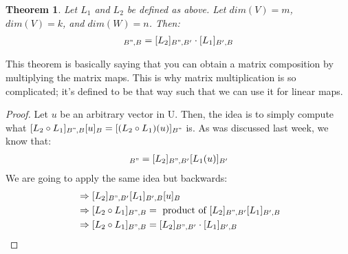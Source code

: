 \documentclass[a4paper, 12pt]{article}
\newtheorem{theorem}{Theorem}
\theoremstyle{definition}
\theoremstyle{definition}
\theoremstyle{definition}
\theoremstyle{definition}
\begin{document}
{\begin{theorem}
	Let $L_1$ and $L_2$ be defined as above. Let $dim(V) = m$, $dim(V) = k$, and $dim(W) = n$. Then: 
	\begin{align*}
		[L_2 \circ L_1 ]_{B", B} = [L_2]_{B",B'} \cdot [L_1]_{B',B} 
	\end{align*}
\end{theorem}
This theorem is basically saying that you can obtain a matrix composition by multiplying the matrix maps. This is why matrix multiplication is so complicated; it's defined to be that way such that we can use it for linear maps. 
\begin{proof}
	Let $u$ be an arbitrary vector in U. Then, the idea is to simply compute what $[L_2 \circ L_1]_{B", B} [u]_B = [(L_2 \circ L_1)(u)]_{B"}$ is. As was discussed last week, we know that: 
	\begin{align*}
		[L_2(L_1(u))]_{B"} = [L_2]_{B", B'}[L_1(u)]_{B'}
	\end{align*}
	We are going to apply the same idea but backwards: 
	\begin{align*}
		& \Rightarrow [L_2]_{B", B'} [L_1]_{B',B}[u]_B \\
		& \Rightarrow [L_2 \circ L_1]_{B", B} = \mbox{ product of } [L_2]_{B",B'}[L_1]_{B',B} \\
		& \Rightarrow [L_2 \circ L_1]_{B", B} = [L_2]_{B", B'} \cdot [L_1]_{B', B} 
	\end{align*}
\end{proof}

}
\end{document}

